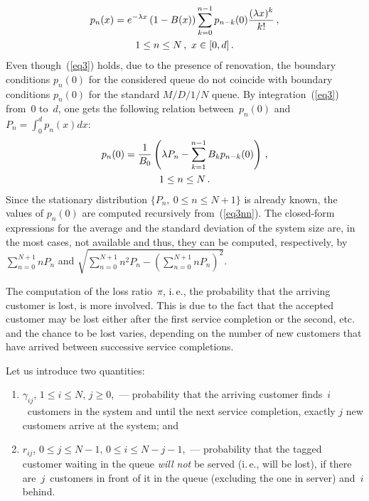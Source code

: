 \begin{multicols}{2}
\noindent
\begin{multline}
\label{eq3}
p_n(x)=e^{-\lambda x} \left (1-B(x) \right ) 
\sum\limits_{k=0}^{n-1} p_{n-k}(0) 
\displaystyle\frac{\displaystyle (\lambda x)^k\mathstrut}{\displaystyle k!\mathstrut}\,, \\
1 \le n \le N\,,  \ x \in [0,d]\,.
\end{multline}
Even though~(\ref{eq3}) holds,
due to the presence of renovation, the boundary conditions $p_{n}(0)$ 
for the considered queue do not coincide 
with boundary conditions $p_{n}(0)$ for the standard $M/D/1/N$ queue.
By integration~(\ref{eq3}) from~0 to~$d$, one gets 
the following relation between~$p_{n}(0)$ and $P_n=\int\nolimits_0^d p_n(x) dx$: 
\begin{multline}
\label{eq3nn}
p_n(0)
= \displaystyle\frac{\displaystyle 1\mathstrut}{\displaystyle B_0\mathstrut} \left (\lambda P_n- \sum\limits_{k=1}^{n-1} B_k p_{n-k}(0)
\right )\,, \\ 
1 \le n \le N\,.
\end{multline}
Since the stationary distribution \mbox{$\{P_n, \ 0 \le n \le N+1\}$} 
is already known, the values of $p_n(0)$ are computed recursively from~(\ref{eq3nn}).
The closed-form expressions for
 the average and the standard deviation of the system size are, in the most cases,
 not available and thus, they can be computed,
respectively, by $\sum\nolimits_{n=0}^{N+1} nP_n$ and  
$\sqrt{\sum\nolimits_{n=0}^{N+1} n^2P_n-(\sum_{n=0}^{N+1} nP_n)^2}$.

The computation of the loss ratio~$\pi$, i.\,e., the probability that the arriving customer is lost, 
is more involved. This is due to the fact that the accepted customer
may be lost either after the first service completion or the second, etc.
and the chance to be lost varies, depending on the number of
new customers that have arrived between successive service completions.
 
Let us introduce two quantities:
\begin{enumerate}[(1)]
\item $\gamma_{ij}$, $1 \le i \le N$, $j \ge 0$,~--- probability that the arriving customer
finds~$i$~customers in the system and until the next
service completion, exactly $j$ new customers arrive 
at the system; and
\item
$r_{ij}$, $0\le j \le N-1$, $0 \le i \le N-j-1$,~--- probability that the 
tagged customer waiting in the queue
\textit{will not} be served (i.\,e., will be lost), if there are~$j$~customers
 in front of it in the queue (excluding the one in server)
and~$i$ behind.
\end{enumerate}


\end{multicols}
